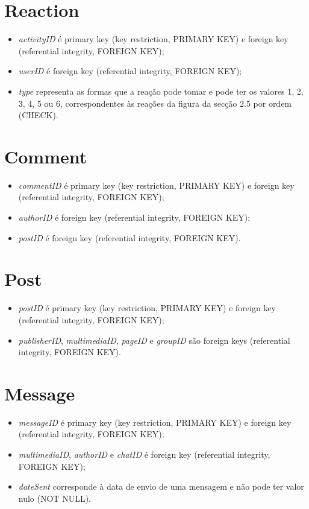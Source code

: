 \documentclass[12pt]{report}
\begin{document}
\section{Reaction}

\begin{itemize}
    \item \textit{activityID} é primary key (key restriction, PRIMARY KEY) e foreign key (referential integrity, FOREIGN KEY);
    \item \textit{userID} é foreign key (referential integrity, FOREIGN KEY);
    \item \textit{type} representa as formas que a reação pode tomar e pode ter os valores 1, 2, 3, 4, 5 ou 6, correspondentes às reações da figura da secção 2.5 por ordem (CHECK).
\end{itemize}

\section{Comment}

\begin{itemize}
    \item \textit{commentID} é primary key (key restriction, PRIMARY KEY) e foreign key (referential integrity, FOREIGN KEY);
    \item \textit{authorID} é foreign key (referential integrity, FOREIGN KEY);
    \item \textit{postID} é foreign key (referential integrity, FOREIGN KEY).
\end{itemize}

\section{Post}

\begin{itemize}
    \item \textit{postID} é primary key (key restriction, PRIMARY KEY) e foreign key (referential integrity, FOREIGN KEY);
    \item \textit{publisherID}, \textit{multimediaID}, \textit{pageID} e \textit{groupID} são foreign keys (referential integrity, FOREIGN KEY).
\end{itemize}
    
\section{Message}

\begin{itemize}
    \item \textit{messageID} é primary key (key restriction, PRIMARY KEY) e foreign key (referential integrity, FOREIGN KEY);
    \item \textit{multimediaID}, \textit{authorID} e \textit{chatID} é foreign key (referential integrity, FOREIGN KEY);
    \item \textit{dateSent} corresponde à data de envio de uma mensagem e não pode ter valor nulo (NOT NULL).
\end{itemize}
\end{document}
